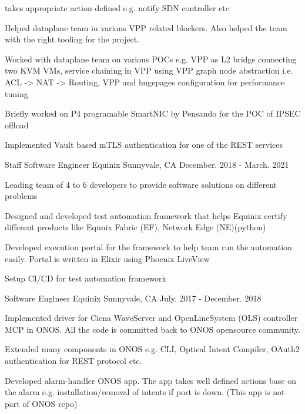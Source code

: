 \begin{cventries}
{\begin{cvitems}
{               takes appropriate action defined e.g. notify SDN controller etc}
        \item {Helped dataplane team in various VPP related blockers. Also helped the team with the right tooling for the project.}
        \item {Worked with dataplane team on various POCs e.g. VPP as L2 bridge connecting two KVM VMs, service chaining in VPP using VPP graph node abstraction i.e. ACL -> NAT -> Routing,
               VPP and hugepages configuration for performance tuning}
        \item {Briefly worked on P4 programable SmartNIC by Pensando for the POC of IPSEC offload}
        \item {Implemented Vault based mTLS authentication for one of the REST services}
      \end{cvitems}
    }

  \cventry
    {Staff Software Engineer} %
    {Equinix} %
    {Sunnyvale, CA} %
    {December. 2018 - March. 2021} %
    {
      \begin{cvitems} %
        \item {Leading team of 4 to 6 developers to provide software solutions on different problems}
        \item {Designed and developed test automation framework that helps Equinix certify different
               products like Equnix Fabric (EF), Network Edge (NE)(python)}
        \item {Developed execution portal for the framework to help team run the automation easily. Portal is written in Elixir using Phoenix LiveView}
        \item {Setup CI/CD for test automation framework}
      \end{cvitems}
    }

  \cventry
    {Software Engineer} %
    {Equinix} %
    {Sunnyvale, CA} %
    {July. 2017 - December. 2018} %
    {
      \begin{cvitems} %
        \item {Implemented driver for Ciena WaveServer and OpenLineSystem (OLS) controller MCP in ONOS.
               All the code is committed back to ONOS opensource community.}
        \item {Extended many components in ONOS e.g. CLI, Optical Intent Compiler, OAuth2
               authentication for REST protocol etc.}
        \item {Developed alarm-handler ONOS app. The app takes well defined
               actions base on the alarm e.g. installation/removal of intents if port is down.
               (This app is not part of ONOS repo)}
      \end{cvitems}
    }


\end{cventries}
